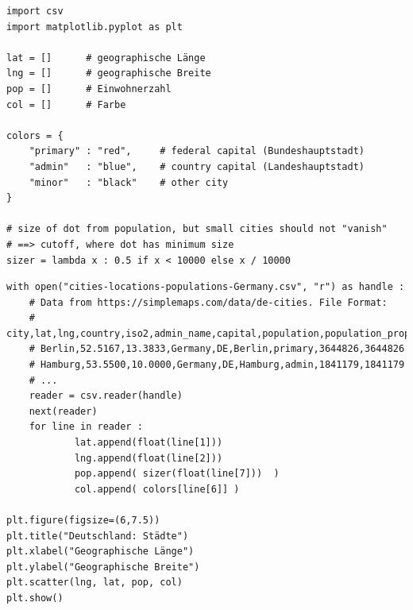 \begin{frame}[fragile]
%
\begin{codebox}
\begin{verbatim}
import csv
import matplotlib.pyplot as plt

lat = []      # geographische Länge
lng = []      # geographische Breite
pop = []      # Einwohnerzahl
col = []      # Farbe

colors = {
    "primary" : "red",     # federal capital (Bundeshauptstadt)
    "admin"   : "blue",    # country capital (Landeshauptstadt)
    "minor"   : "black"    # other city
}

# size of dot from population, but small cities should not "vanish"
# ==> cutoff, where dot has minimum size
sizer = lambda x : 0.5 if x < 10000 else x / 10000
\end{verbatim}
\end{codebox}
%
\end{frame}


\begin{frame}[fragile]
%
\begin{codebox}[... continued]
\begin{verbatim}
with open("cities-locations-populations-Germany.csv", "r") as handle :
    # Data from https://simplemaps.com/data/de-cities. File Format:
    # city,lat,lng,country,iso2,admin_name,capital,population,population_proper
    # Berlin,52.5167,13.3833,Germany,DE,Berlin,primary,3644826,3644826
    # Hamburg,53.5500,10.0000,Germany,DE,Hamburg,admin,1841179,1841179
    # ...
    reader = csv.reader(handle)
    next(reader)
    for line in reader :
            lat.append(float(line[1]))
            lng.append(float(line[2]))
            pop.append( sizer(float(line[7]))  )
            col.append( colors[line[6]] )

plt.figure(figsize=(6,7.5))
plt.title("Deutschland: Städte")
plt.xlabel("Geographische Länge")
plt.ylabel("Geographische Breite")
plt.scatter(lng, lat, pop, col)
plt.show()
\end{verbatim}
\end{codebox}
%
\end{frame}


